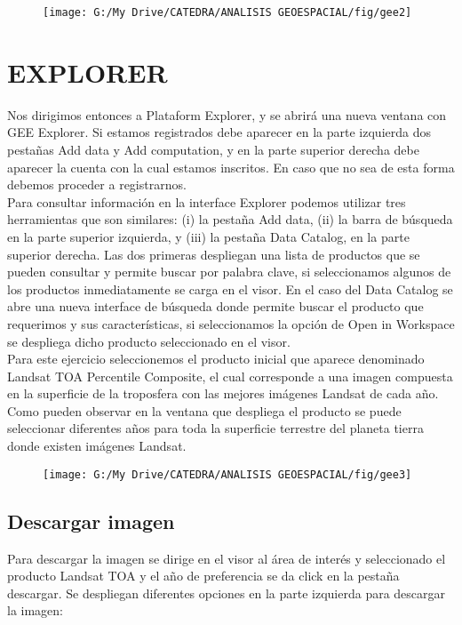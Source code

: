 \documentclass[a4paper,oneside,11pt,]{article}
\begin{document}
\begin{figure}
\centering
\texttt{[image: G:/My Drive/CATEDRA/ANALISIS GEOESPACIAL/fig/gee2]}
\end{figure}

\section{EXPLORER}
Nos dirigimos entonces a Plataform Explorer, y se abrirá una nueva ventana con GEE Explorer. Si estamos registrados debe aparecer en la parte izquierda dos pestañas Add data y Add computation, y en la parte superior derecha debe aparecer la cuenta con la cual estamos inscritos. En caso que no sea de esta forma debemos proceder a registrarnos.\\
Para consultar información en la interface Explorer podemos utilizar tres herramientas que son similares: (i) la pestaña Add data, (ii) la barra de búsqueda en la parte superior izquierda, y (iii) la pestaña Data Catalog, en la parte superior derecha. Las dos primeras despliegan una lista de productos que se pueden consultar y permite buscar por palabra clave, si seleccionamos algunos de los productos inmediatamente se carga en el visor. En el caso del Data Catalog se abre una nueva interface de búsqueda donde permite buscar el producto que requerimos y sus características, si seleccionamos la opción de Open in Workspace se despliega dicho producto seleccionado en el visor.\\
Para este ejercicio seleccionemos el producto inicial que aparece denominado Landsat TOA Percentile Composite, el cual corresponde a una imagen compuesta en la superficie de la troposfera con las mejores imágenes Landsat de cada año. Como pueden observar en la ventana que despliega el producto se puede seleccionar diferentes años para toda la superficie terrestre del planeta tierra donde existen imágenes Landsat.

\begin{figure}
\centering
\texttt{[image: G:/My Drive/CATEDRA/ANALISIS GEOESPACIAL/fig/gee3]}
\end{figure}

\subsection{Descargar imagen}
Para descargar la imagen se dirige en el visor al área de interés y seleccionado el producto Landsat TOA y el año de preferencia se da click en la pestaña descargar. Se despliegan diferentes opciones en la parte izquierda para descargar la imagen:
\end{document}
